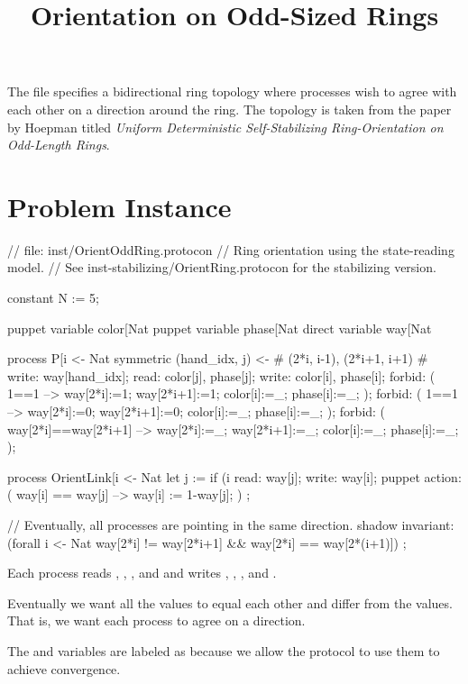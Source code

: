 
\title{Orientation on Odd-Sized Rings}
\date{}



The  file specifies a bidirectional ring topology where processes wish to agree with each other on a direction around the ring.
The topology is taken from the paper by Hoepman titled \textit{Uniform Deterministic Self-Stabilizing Ring-Orientation on Odd-Length Rings}.

\section{Problem Instance}
\begin{code}
// file: inst/OrientOddRing.protocon
// Ring orientation using the state-reading model.
// See inst-stabilizing/OrientRing.protocon for the stabilizing version.

constant N := 5;

puppet variable color[Nat %
puppet variable phase[Nat %
direct variable way[Nat %

process P[i <- Nat %
{
  symmetric (hand_idx, j)  <- {# (2*i, i-1), (2*i+1, i+1) #}
  {
    write: way[hand_idx];
    read: color[j], phase[j];
  }
  write: color[i], phase[i];
  forbid: ( 1==1 --> way[2*i]:=1; way[2*i+1]:=1; color[i]:=_; phase[i]:=_; );
  forbid: ( 1==1 --> way[2*i]:=0; way[2*i+1]:=0; color[i]:=_; phase[i]:=_; );
  forbid: ( way[2*i]==way[2*i+1] --> way[2*i]:=_; way[2*i+1]:=_; color[i]:=_; phase[i]:=_; );
}

process OrientLink[i <- Nat %
{
  let j := if (i %
  read: way[j];
  write: way[i];
  puppet action:
    ( way[i] == way[j] --> way[i] := 1-way[j]; )
    ;
}

// Eventually, all processes are pointing in the same direction.
shadow invariant:
  (forall i <- Nat %
   way[2*i] != way[2*i+1]
   &&
   way[2*i] == way[2*(i+1)])
  ;
\end{code}

Each process  reads , , , and  and writes , , , and .

Eventually we want all the  values to equal each other and differ from the  values.
That is, we want each process to agree on a direction.

The  and  variables are labeled as  because we allow the protocol to use them to achieve convergence.


